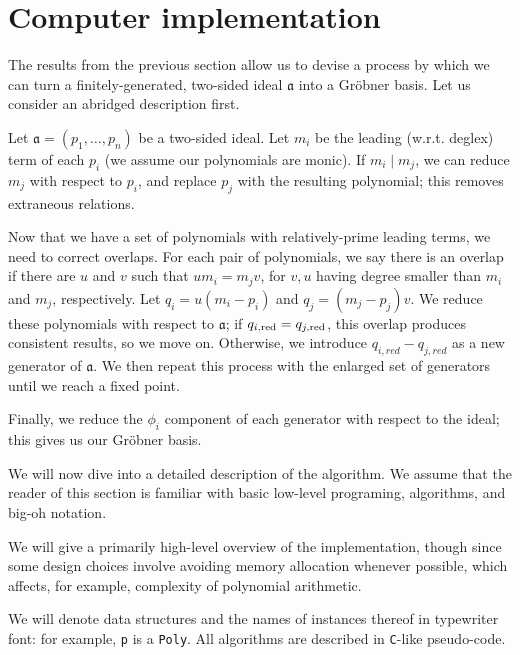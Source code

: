 \section{Computer implementation}
\label{sec:implementation}

The results from the previous section allow us to devise a process by which we can
turn a finitely-generated, two-sided ideal $\mathfrak{a}$ into a Gr\"obner basis.
Let us consider an abridged description first.

\begin{alg}
    Let $\mathfrak{a} = (p_1,\ldots,p_n)$ be a two-sided ideal. Let $m_i$ be the 
    leading (w.r.t. deglex) term of each $p_i$ (we assume our polynomials are monic).
    If $m_i \mid m_j$, we can reduce $m_j$ with respect to $p_i$, and replace $p_j$
    with the resulting polynomial; this removes extraneous relations.
    
    Now that we have a set of polynomials with relatively-prime leading terms, we need
    to correct overlaps. For each pair of polynomials, we say there is an overlap 
    if there are $u$ and $v$ such that $um_i = m_j v$, for $v, u$ having degree smaller 
    than $m_i$ and $m_j$, respectively. Let $q_i = u(m_i - p_i)$ and $q_j = (m_j - p_j)v$.
    We reduce these polynomials with respect to $\mathfrak{a}$; if $q_{i,\mathrm{red}} = q_{j,\mathrm{red}}$,
    this overlap produces consistent results, so we move on. Otherwise, we introduce
    $q_{i,red} - q_{j,red}$ as a new generator of $\mathfrak{a}$. 
    We then repeat this process with the enlarged set of generators 
    until we reach a fixed point.
    
    Finally, we reduce the $\phi_i$ component of each generator with respect to the 
    ideal; this gives us our Gr\"obner basis.
\end{alg}

We will now dive into a detailed description of the algorithm. We assume that the
reader of this section is familiar with basic low-level programing, algorithms, and
big-oh notation.

\begin{rem}
    We will give a primarily high-level overview of the implementation, though since some
    design choices involve avoiding memory allocation whenever possible, which
    affects, for example, complexity of polynomial arithmetic. 
    
    We will denote data structures and the names of instances thereof in typewriter font:
    for example, \verb|p| is a \verb|Poly|. All algorithms are described in
    \verb|C|-like pseudo-code.
\end{rem}

